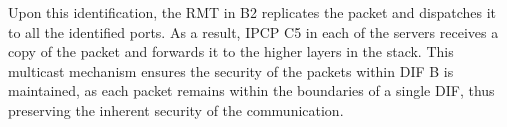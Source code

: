 \documentclass{ieeeaccess}
\begin{document}
Upon this identification, the RMT in B2 replicates the packet and dispatches it to all the identified ports. As a result, IPCP C5 in each of the servers receives a copy of the packet and forwards it to the higher layers in the stack. This multicast mechanism ensures the security of the packets within DIF B is maintained, as each packet remains within the boundaries of a single DIF, thus preserving the inherent security of the communication.





\end{document}
